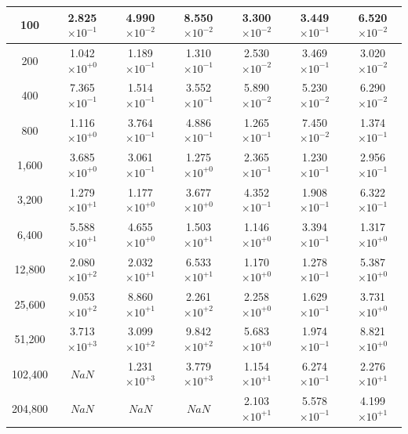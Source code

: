 \documentclass[12pt,a4paper]{article}
\begin{document}
\begin{landscape}
\begin{center}
\begin{longtable}{@{}|c|c|c|c|c|c|c|@{}}
\midrule
\endhead
{ 100}        & { 2.825$\times10^{-1}$} & { 4.990$\times10^{-2}$} & { 8.550$\times10^{-2}$} & { 3.300$\times10^{-2}$} & { 3.449$\times10^{-1}$} & { 6.520$\times10^{-2}$} \\ \midrule
{ 200}        & { 1.042$\times10^{+0}$} & { 1.189$\times10^{-1}$} & { 1.310$\times10^{-1}$} & { 2.530$\times10^{-2}$} & { 3.469$\times10^{-1}$} & { 3.020$\times10^{-2}$} \\ \midrule
{ 400}        & { 7.365$\times10^{-1}$} & { 1.514$\times10^{-1}$} & { 3.552$\times10^{-1}$} & { 5.890$\times10^{-2}$} & { 5.230$\times10^{-2}$} & { 6.290$\times10^{-2}$} \\ \midrule
{ 800}        & { 1.116$\times10^{+0}$} & { 3.764$\times10^{-1}$} & { 4.886$\times10^{-1}$} & { 1.265$\times10^{-1}$} & { 7.450$\times10^{-2}$} & { 1.374$\times10^{-1}$} \\ \midrule
{ 1,600}      & { 3.685$\times10^{+0}$} & { 3.061$\times10^{-1}$} & { 1.275$\times10^{+0}$} & { 2.365$\times10^{-1}$} & { 1.230$\times10^{-1}$} & { 2.956$\times10^{-1}$} \\ \midrule
{ 3,200}      & { 1.279$\times10^{+1}$} & { 1.177$\times10^{+0}$} & { 3.677$\times10^{+0}$} & { 4.352$\times10^{-1}$} & { 1.908$\times10^{-1}$} & { 6.322$\times10^{-1}$} \\ \midrule
{ 6,400}      & { 5.588$\times10^{+1}$} & { 4.655$\times10^{+0}$} & { 1.503$\times10^{+1}$} & { 1.146$\times10^{+0}$} & { 3.394$\times10^{-1}$} & { 1.317$\times10^{+0}$} \\ \midrule
{ 12,800}     & { 2.080$\times10^{+2}$} & { 2.032$\times10^{+1}$} & { 6.533$\times10^{+1}$} & { 1.170$\times10^{+0}$} & { 1.278$\times10^{-1}$} & { 5.387$\times10^{+0}$} \\ \midrule
{ 25,600}     & { 9.053$\times10^{+2}$} & { 8.860$\times10^{+1}$} & { 2.261$\times10^{+2}$} & { 2.258$\times10^{+0}$} & { 1.629$\times10^{-1}$} & { 3.731$\times10^{+0}$} \\ \midrule
{ 51,200}     & { 3.713$\times10^{+3}$} & { 3.099$\times10^{+2}$} & { 9.842$\times10^{+2}$} & { 5.683$\times10^{+0}$} & { 1.974$\times10^{-1}$} & { 8.821$\times10^{+0}$} \\ \midrule
{ 102,400}    & { $NaN$}                & { 1.231$\times10^{+3}$} & { 3.779$\times10^{+3}$} & { 1.154$\times10^{+1}$} & { 6.274$\times10^{-1}$} & { 2.276$\times10^{+1}$} \\ \midrule
{ 204,800}    & { $NaN$}                & { $NaN$}                & { $NaN$}                & { 2.103$\times10^{+1}$} & { 5.578$\times10^{-1}$} & { 4.199$\times10^{+1}$} \\ \midrule

\end{longtable}
\end{center}
\end{landscape}
\end{document}
